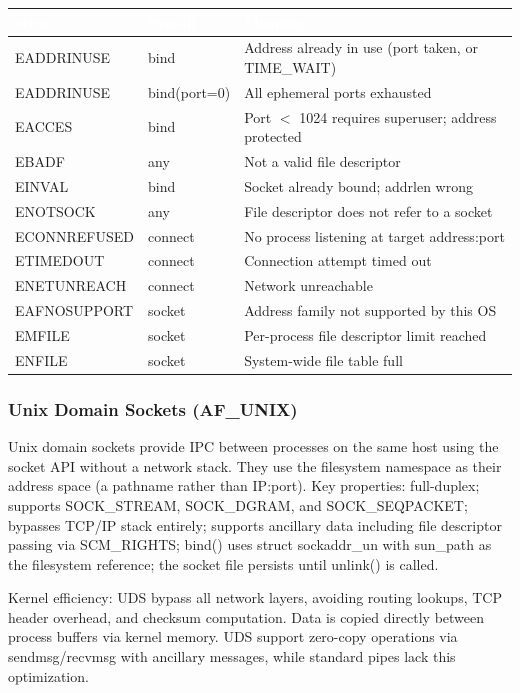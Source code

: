 \documentclass[11pt,letterpaper]{article}
\newcommand{\tableheader}[1]{\textbf{\sffamily\textcolor{white}{#1}}}
\begin{document}
\begin{center}
\begin{tabularx}{\textwidth}{L{2.8cm}L{2.5cm}X}
\toprule
{}
\tableheader{errno} & \tableheader{Syscall} & \tableheader{Meaning} \\
\midrule
EADDRINUSE & bind & Address already in use (port taken, or TIME\_WAIT) \\
EADDRINUSE & bind(port=0) & All ephemeral ports exhausted \\
EACCES & bind & Port $<$ 1024 requires superuser; address protected \\
EBADF & any & Not a valid file descriptor \\
EINVAL & bind & Socket already bound; addrlen wrong \\
ENOTSOCK & any & File descriptor does not refer to a socket \\
ECONNREFUSED & connect & No process listening at target address:port \\
ETIMEDOUT & connect & Connection attempt timed out \\
ENETUNREACH & connect & Network unreachable \\
EAFNOSUPPORT & socket & Address family not supported by this OS \\
EMFILE & socket & Per-process file descriptor limit reached \\
ENFILE & socket & System-wide file table full \\
\bottomrule
\end{tabularx}
\end{center}

\subsubsection{Unix Domain Sockets (AF\_UNIX)}

Unix domain sockets provide IPC between processes on the same host using the socket API without a network stack. They use the filesystem namespace as their address space (a pathname rather than IP:port). Key properties: full-duplex; supports SOCK\_STREAM, SOCK\_DGRAM, and SOCK\_SEQPACKET; bypasses TCP/IP stack entirely; supports ancillary data including file descriptor passing via SCM\_RIGHTS; bind() uses struct sockaddr\_un with sun\_path as the filesystem reference; the socket file persists until unlink() is called.

Kernel efficiency: UDS bypass all network layers, avoiding routing lookups, TCP header overhead, and checksum computation. Data is copied directly between process buffers via kernel memory. UDS support zero-copy operations via sendmsg/recvmsg with ancillary messages, while standard pipes lack this optimization.
\end{document}
